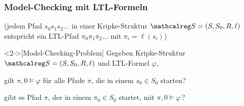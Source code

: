     \begin{frame}
      \frametitle{Model-Checking mit LTL-Formeln}

      \par\smallskip
      (jedem Pfad $s_0s_1s_2\dots$ in einer Kripke-Struktur $\calS=(S,S_0,R,\ell)$
      entspricht ein LTL-Pfad $\pi_0\pi_1\pi_2\dots$ mit $\pi_i=\ell(s_i)$)
      
      \par\bigskip
      \begin{Definition}<2->[Model-Checking-Problem]
        Gegeben Kripke-Struktur $\calS=(S,S_0,R,\ell)$ und LTL-Formel $\varphi$,
        \begin{Itemize}
          \item
            gilt $\pi,0 \models \varphi$ für alle Pfade $\pi$, die in einem $s_0 \in S_0$ starten?\\
          \item<3->
            gibt es Pfad $\pi$, der in einem $\pi_0 \in S_0$ startet, mit $\pi,0 \models \varphi$\,?\\
        \end{Itemize}
      \end{Definition}
      
      \par\bigskip
      
    \end{frame}

